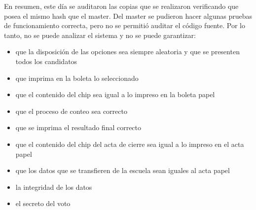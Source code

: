 En resumen, este día se auditaron las copias que se realizaron verificando que posea el mismo hash que el master.  Del master se pudieron hacer algunas pruebas de funcionamiento correcta, pero no se permitió auditar el código fuente. Por lo tanto, no se puede analizar el sistema y no se puede garantizar: 
 \begin{itemize}
     \item que la disposición de las opciones sea siempre aleatoria y que se presenten todos los candidatos 
     \item que imprima en la boleta lo seleccionado 
     \item que el contenido del chip sea igual a lo impreso en la boleta papel 
     \item que el proceso de conteo sea correcto 
     \item que se imprima el resultado final correcto 
     \item que el contenido del chip del acta de cierre sea igual a lo impreso en el acta papel 
     \item que los datos que se transfieren de la escuela sean iguales al acta papel
     \item la integridad de los datos
     \item el secreto del voto
 \end{itemize}


